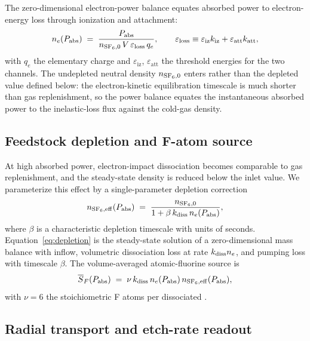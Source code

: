 The zero-dimensional electron-power balance equates absorbed power
to electron-energy loss through ionization and attachment:
\begin{equation}
  n_e(P_{\mathrm{abs}})
  \;=\;
  \frac{P_{\mathrm{abs}}}
       {n_{\mathrm{SF}_6,0}\,V\,\varepsilon_{\mathrm{loss}}\,q_e},
  \qquad
  \varepsilon_{\mathrm{loss}}
  \equiv \varepsilon_{\mathrm{iz}}k_{\mathrm{iz}}
         + \varepsilon_{\mathrm{att}}k_{\mathrm{att}},
  \label{eq:power-balance}
\end{equation}
with $q_e$ the elementary charge and
$\varepsilon_{\mathrm{iz}}$, $\varepsilon_{\mathrm{att}}$ the
threshold energies for the two channels. The undepleted neutral
density $n_{\mathrm{SF}_6,0}$ enters rather than the depleted value defined
below: the electron-kinetic equilibration timescale is much shorter
than gas replenishment, so the power balance equates the
instantaneous absorbed power to the inelastic-loss flux against the
cold-gas density.

\subsection{Feedstock depletion and F-atom source}
\label{sec:model:depletion}

At high absorbed power, electron-impact dissociation becomes
comparable to gas replenishment, and the steady-state \sfsix{}
density is reduced below the inlet value. We parameterize this
effect by a single-parameter depletion correction
\begin{equation}
  n_{\mathrm{SF}_6,\mathrm{eff}}(P_{\mathrm{abs}})
  \;=\;
  \frac{n_{\mathrm{SF}_6,0}}{1 + \beta\,k_{\mathrm{diss}}\,n_e(P_{\mathrm{abs}})},
  \label{eq:depletion}
\end{equation}
where $\beta$ is a characteristic depletion timescale with units of
seconds. Equation~\eqref{eq:depletion} is the steady-state solution
of a zero-dimensional mass balance with inflow, volumetric
dissociation loss at rate $k_{\mathrm{diss}}n_e$, and pumping loss with
timescale $\beta$. The volume-averaged atomic-fluorine source is
\begin{equation}
  \overline{S}_F(P_{\mathrm{abs}})
  \;=\;
  \nu\,k_{\mathrm{diss}}\,n_e(P_{\mathrm{abs}})\,
        n_{\mathrm{SF}_6,\mathrm{eff}}(P_{\mathrm{abs}}),
  \label{eq:source}
\end{equation}
with $\nu = 6$ the stoichiometric F atoms per dissociated \sfsix{}.

\subsection{Radial transport and etch-rate readout}
\label{sec:model:transport}


